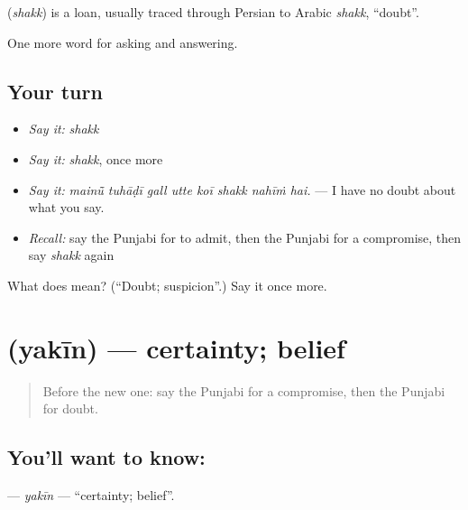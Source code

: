 \begin{cousinweb}
\textbf{} (\emph{shakk}) is a loan, usually traced through Persian to Arabic \emph{shakk}, \textquotedblleft{}doubt\textquotedblright{}.
\end{cousinweb}

\begin{grammarlens}[title={What you've built}]
One more word for asking and answering.
\end{grammarlens}

\subsection*{Your turn}
\begin{itemize}
\raggedright
  \item \emph{Say it:} \emph{shakk}
  \item \emph{Say it:} \emph{shakk}, once more
  \item \emph{Say it:} \emph{mainū̃ tuhāḍī gall utte koī shakk nahīṁ hai.} — I have no doubt about what you say.
  \item \emph{Recall:} say the Punjabi for to admit, then the Punjabi for a compromise, then say \emph{shakk} again
\end{itemize}

\begin{tcolorbox}[breakable,colback=teal!4,colframe=teal!35!black,title={Before you move on}]
What does  mean? (\textquotedblleft{}Doubt; suspicion\textquotedblright{}.) Say it once more.
\end{tcolorbox}
\section[\texorpdfstring{\pa{ਯਕੀਨ} (yakīn)}{ਯਕੀਨ (yakīn)}]{ (yakīn) — certainty; belief}

\label{lesson:PA-C341-yakin}



\begin{quote}
Before the new one: say the Punjabi for a compromise, then the Punjabi for doubt.
\end{quote}

\subsection*{You'll want to know: }
\textbf{} — \emph{yakīn} — \textquotedblleft{}certainty; belief\textquotedblright{}.

